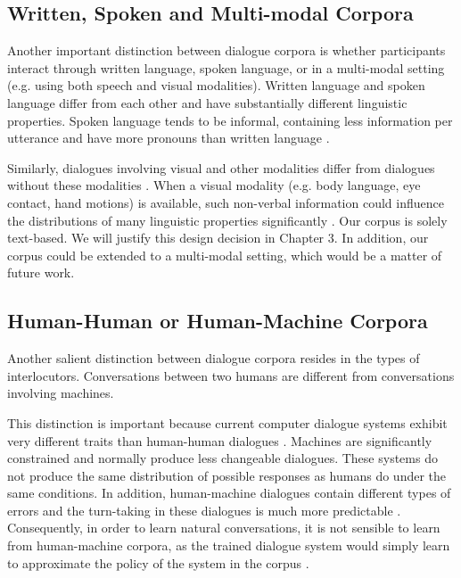 \documentclass[bsc,frontabs,twoside,singlespacing,parskip,deptreport]{infthesis}     %
\begin{document}
\subsection{Written, Spoken and Multi-modal Corpora}

Another important distinction between dialogue corpora is whether participants interact through written language, spoken language, or in a multi-modal setting (e.g. using both speech and visual modalities). Written language and spoken language differ from each other and have substantially different linguistic properties. Spoken language tends to be informal, containing less information per utterance and have more pronouns than written language \cite{carter2006cambridge,biber2001diachronic}.

Similarly, dialogues involving visual and other modalities differ from dialogues without these modalities \cite{serban2015survey,duncan1983charles}. When a visual modality (e.g. body language, eye contact, hand motions) is available, such non-verbal information could influence the distributions of many linguistic properties significantly \cite{gibson1963perception,lord1974perception,cooper1974control,chartrand1999chameleon,de2013speaker}. Our corpus is solely text-based. We will justify this design decision in Chapter 3. In addition, our corpus could be extended to a multi-modal setting, which would be a matter of future work.

\subsection{Human-Human or Human-Machine Corpora}

Another salient distinction between dialogue corpora resides in the types of interlocutors. Conversations between two humans are different from conversations involving machines.

This distinction is important because current computer dialogue systems exhibit very different traits than human-human dialogues \cite{doran2003comparing}. Machines are significantly constrained and normally produce less changeable dialogues. These systems do not produce the same distribution of possible responses as humans do under the same conditions. In addition, human-machine dialogues contain different types of errors and the turn-taking in these dialogues is much more predictable \cite{williams2007partially}. Consequently, in order to learn natural conversations, it is not sensible to learn from human-machine corpora, as the trained dialogue system would simply learn to approximate the policy of the system in the corpus \cite{serban2018survey}.
\end{document}
